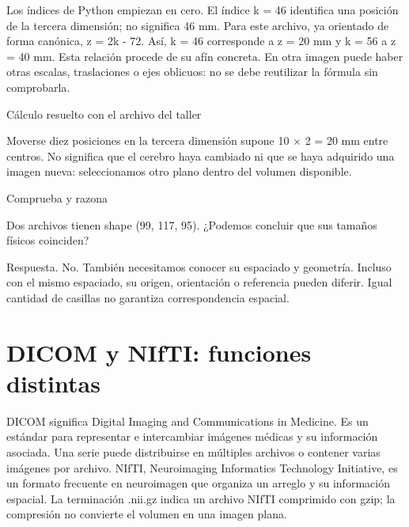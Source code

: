 Los índices de Python empiezan en cero. El índice k = 46 identifica una posición de la tercera dimensión; no significa 46 mm. Para este archivo, ya orientado de forma canónica, z = 2k - 72. Así, k = 46 corresponde a z = 20 mm y k = 56 a z = 40 mm. Esta relación procede de su afín concreta. En otra imagen puede haber otras escalas, traslaciones o ejes oblicuos: no se debe reutilizar la fórmula sin comprobarla.



\begin{Idea}{Cálculo resuelto con el archivo del taller}

Moverse diez posiciones en la tercera dimensión supone 10 × 2 = 20 mm entre centros. No significa que el cerebro haya cambiado ni que se haya adquirido una imagen nueva: seleccionamos otro plano dentro del volumen disponible.


\end{Idea}


\begin{Practica}{Comprueba y razona}

Dos archivos tienen shape (99, 117, 95). ¿Podemos concluir que sus tamaños físicos coinciden?


Respuesta. No. También necesitamos conocer su espaciado y geometría. Incluso con el mismo espaciado, su origen, orientación o referencia pueden diferir. Igual cantidad de casillas no garantiza correspondencia espacial.


\end{Practica}

\section{DICOM y NIfTI: funciones distintas}

DICOM significa Digital Imaging and Communications in Medicine. Es un estándar para representar e intercambiar imágenes médicas y su información asociada. Una serie puede distribuirse en múltiples archivos o contener varias imágenes por archivo. NIfTI, Neuroimaging Informatics Technology Initiative, es un formato frecuente en neuroimagen que organiza un arreglo y su información espacial. La terminación .nii.gz indica un archivo NIfTI comprimido con gzip; la compresión no convierte el volumen en una imagen plana.



